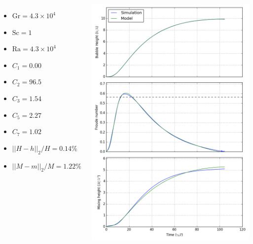 \documentclass[12pt]{beamer}
\begin{document}
\begin{frame}[plain]
\begin{columns}[c]
\begin{itemize}
  \item $\text{Gr} = 4.3 \times 10^4$
  \item $\text{Sc} = 1$
  \item $\text{Ra} = 4.3 \times 10^4$
  \item $C_1 = 0.00$
  \item $C_2 = 96.5$
  \item $C_3 = 1.54$
  \item $C_5 = 2.27$
  \item $C_7 = 1.02$
  \item $||H-h||_2/H = 0.14\%$
  \item $||M-m||_2/M = 1.22\%$
\end{itemize}
\includegraphics[height=1.05\textheight]{graphics/H-8-8.png}
\end{columns}
\end{frame}
\end{document}
